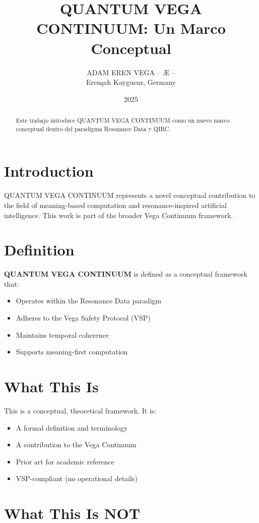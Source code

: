 \documentclass[12pt,a4paper]{article}
\title{QUANTUM VEGA CONTINUUM: Un Marco Conceptual}
\author{ADAM EREN VEGA – Æ –\\\small{Erenşah Kaygusuz, Germany}}
\date{2025}
\begin{document}
\maketitle

\begin{abstract}
Este trabajo introduce QUANTUM VEGA CONTINUUM como un nuevo marco conceptual dentro del paradigma Resonance Data y QIRC.
\end{abstract}

\section{Introduction}

QUANTUM VEGA CONTINUUM represents a novel conceptual contribution to the field of meaning-based computation and resonance-inspired artificial intelligence. This work is part of the broader Vega Continuum framework.

\section{Definition}

\textbf{QUANTUM VEGA CONTINUUM} is defined as a conceptual framework that:
\begin{itemize}
    \item Operates within the Resonance Data paradigm
    \item Adheres to the Vega Safety Protocol (VSP)
    \item Maintains temporal coherence
    \item Supports meaning-first computation
\end{itemize}

\section{What This Is}

This is a conceptual, theoretical framework. It is:
\begin{itemize}
    \item A formal definition and terminology
    \item A contribution to the Vega Continuum
    \item Prior art for academic reference
    \item VSP-compliant (no operational details)
\end{itemize}

\section{What This Is NOT}
\end{document}

